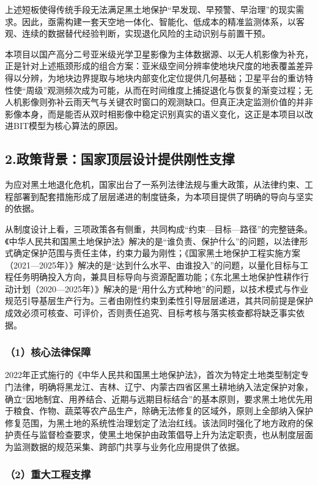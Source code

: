 上述短板使得传统手段无法满足黑土地保护“早发现、早预警、早治理”的现实需求。因此，亟需构建一套天空地一体化、智能化、低成本的精准监测体系，以客观、连续的数据替代经验判断，实现退化风险的主动识别与前置干预。

本项目以国产高分二号亚米级光学卫星影像为主体数据源、以无人机影像为补充，正是针对上述瓶颈形成的组合方案：亚米级空间分辨率使地块尺度的地表覆盖差异得以分辨，为地块边界提取与地块内部变化定位提供几何基础；卫星平台的重访特性使“周级”观测频次成为可能，从而在时间维度上捕捉退化与恢复的渐变过程；无人机影像则弥补云雨天气与关键农时窗口的观测缺口。但真正决定监测价值的并非影像本身，而是能否从双时相影像中稳定识别真实的语义变化，这正是本项目以改进BIT模型为核心算法的原因。

\subsection{2.政策背景：国家顶层设计提供刚性支撑}

为应对黑土地退化危机，国家出台了一系列法律法规与重大政策，从法律约束、工程部署到配套措施形成了层层递进的制度链条，为本项目提供了明确的导向与坚实的依据。

从制度设计上看，三项政策各有侧重，共同构成“约束—目标—路径”的完整链条。《中华人民共和国黑土地保护法》解决的是“谁负责、保护什么”的问题，以法律形式确定保护范围与责任主体，约束力最为刚性；《国家黑土地保护工程实施方案（2021—2025年）》解决的是“达到什么水平、由谁投入”的问题，以量化目标与工程任务明确投入方向，兼具目标导向与资源配置功能；《东北黑土地保护性耕作行动计划（2020—2025年）》解决的是“用什么方式种地”的问题，以技术模式与作业规范引导基层生产行为。三者由刚性约束到柔性引导层层递进，其共同前提是保护成效必须可核查、可评价，否则责任追究、目标考核与落实核查都将缺乏事实依据。

\subsubsection{（1）核心法律保障}

2022年正式施行的《中华人民共和国黑土地保护法》，首次为特定土地类型制定专门法律，明确将黑龙江、吉林、辽宁、内蒙古四省区黑土耕地纳入法定保护对象，确立“因地制宜、用养结合、近期与远期目标结合”的基本原则，要求黑土地优先用于粮食、作物、蔬菜等农产品生产，除确无法修复的区域外，原则上全部纳入保护修复范围，为黑土地的系统性治理划定了法治红线。该法同时强化了地方政府的保护责任与监督检查要求，使黑土地保护由政策倡导上升为法定职责，也从制度层面为监测数据的规范采集、跨部门共享与业务化应用提供了依据。

\subsubsection{（2）重大工程支撑}

